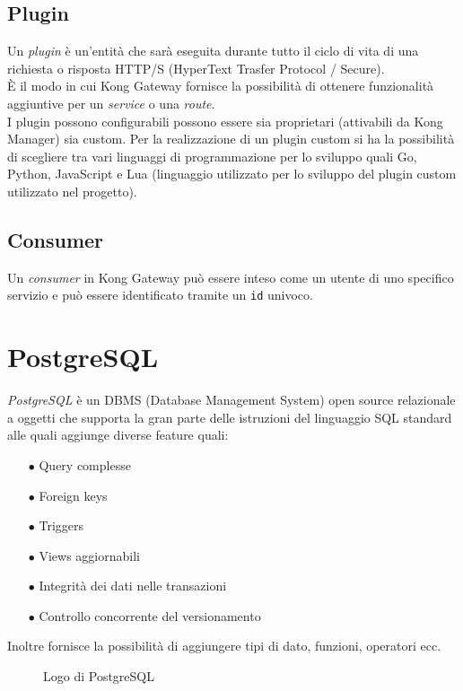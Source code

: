\subsection{Plugin}
Un \emph{plugin} è un’entità che sarà eseguita durante tutto il ciclo di vita di una richiesta o risposta HTTP/S (HyperText Trasfer Protocol / Secure).\\
È il modo in cui Kong Gateway fornisce la possibilità di ottenere funzionalità aggiuntive per un \emph{service} o una \emph{route}.\\
I plugin possono configurabili possono essere sia proprietari (attivabili da Kong Manager) sia custom. Per la realizzazione di un plugin custom si ha la possibilità di scegliere tra vari linguaggi di programmazione per lo sviluppo quali Go, Python, JavaScript e Lua (linguaggio utilizzato per lo sviluppo del plugin custom utilizzato nel progetto).\\ 

\subsection{Consumer}
Un \emph{consumer} in Kong Gateway può essere inteso come un utente di uno specifico servizio e può essere identificato tramite un \texttt{id} univoco.

\section{PostgreSQL}
\emph{PostgreSQL} è un DBMS (Database Management System) open source relazionale a oggetti che supporta la gran parte delle istruzioni del linguaggio SQL standard alle quali aggiunge diverse feature quali:
\begin{itemize}
	\item[$\bullet$]Query complesse
	\item[$\bullet$]Foreign keys
	\item[$\bullet$]Triggers
	\item[$\bullet$]Views aggiornabili
	\item[$\bullet$]Integrità dei dati nelle transazioni
	\item[$\bullet$]Controllo concorrente del versionamento
\end{itemize}
Inoltre fornisce la possibilità di aggiungere tipi di dato, funzioni, operatori ecc.
\begin{figure}[ht]
	\centering
	\caption{Logo di PostgreSQL}
	\label{fig:one}
\end{figure}

